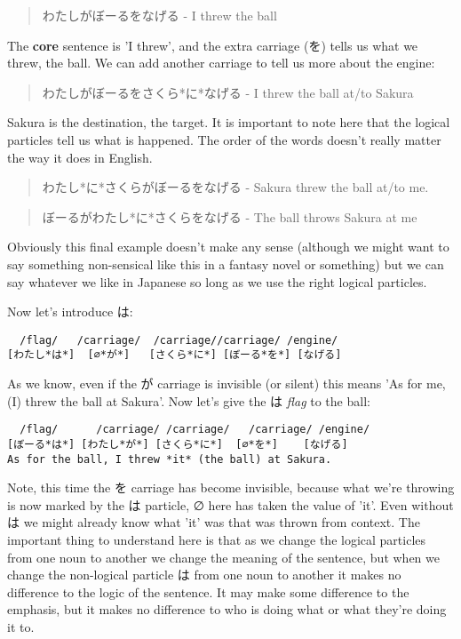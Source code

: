 \documentclass[11pt]{article}
\begin{document}
\begin{quote}
わたしがぼーるをなげる - I threw the ball
\end{quote}
The \textbf{core} sentence is 'I threw', and the extra carriage (を) tells us what we threw, the ball. We can add another carriage to tell us more about the engine:
\begin{quote}
わたしがぼーるをさくら*に*なげる - I threw the ball at/to Sakura
\end{quote}
Sakura is the destination, the target. It is important to note here that the logical particles tell us what is happened. The order of the words doesn't really matter the way it does in English.
\begin{quote}
わたし*に*さくらがぼーるをなげる - Sakura threw the ball at/to me.
\end{quote}
\begin{quote}
ぼーるがわたし*に*さくらをなげる - The ball throws Sakura at me
\end{quote}
Obviously this final example doesn't make any sense (although we might want to say something non-sensical like this in a fantasy novel or something) but we can say whatever we like in Japanese so long as we use the right logical particles.

Now let's introduce は:
\begin{verbatim}
  /flag/   /carriage/  /carriage//carriage/ /engine/
[わたし*は*]  [∅*が*]   [さくら*に*] [ぼーる*を*] [なげる]
\end{verbatim}
As we know, even if the が carriage is invisible (or silent) this means 'As for me, (I) threw the ball at Sakura'. Now let's give the は \emph{flag} to the ball:
\begin{verbatim}
  /flag/      /carriage/ /carriage/   /carriage/ /engine/
[ぼーる*は*] [わたし*が*] [さくら*に*]  [∅*を*]    [なげる]
As for the ball, I threw *it* (the ball) at Sakura.
\end{verbatim}
Note, this time the を carriage has become invisible, because what we're throwing is now marked by the は particle, ∅ here has taken the value of 'it'. Even without は we might already know what 'it' was that was thrown from context. The important thing to understand here is that as we change the logical particles from one noun to another we change the meaning of the sentence, but when we change the non-logical particle は from one noun to another it makes no difference to the logic of the sentence. It may make some difference to the emphasis, but it makes no difference to who is doing what or what they're doing it to.
\end{document}
